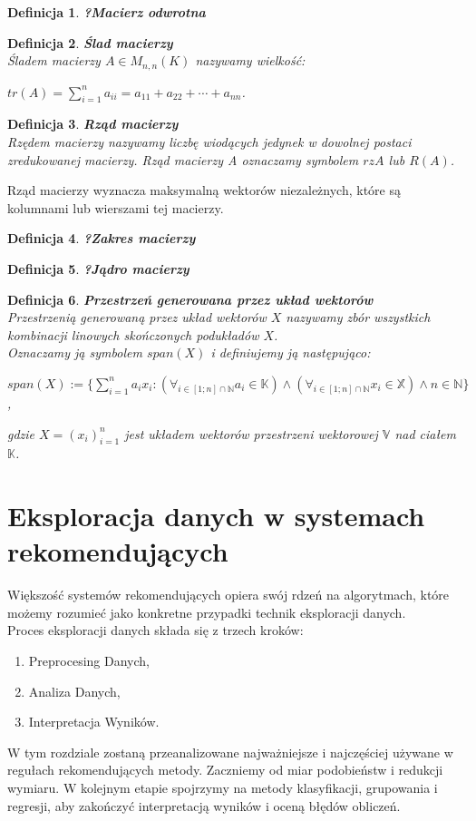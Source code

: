 \documentclass[12pt,a4paper]{report}
\newtheorem{df}{Definicja}
\begin{document}
\begin{df}\textbf{?Macierz odwrotna}
\end{df}

\begin{df}\textbf{Ślad macierzy}
\\Śladem macierzy  $A\in M_{n,n}(K)$ nazywamy wielkość:
\begin{center}
$tr(A) = \sum_{i=1}^n a_{ii} = a_{11} + a_{22} + \cdots + a_{nn}$.
\end{center}
\end{df}
\begin{df}\textbf{Rząd macierzy}%
\\Rzędem macierzy nazywamy liczbę wiodących jedynek w dowolnej postaci zredukowanej macierzy. Rząd macierzy A oznaczamy symbolem $rz A$ lub $R(A)$.
\end{df}
Rząd macierzy wyznacza maksymalną wektorów niezależnych, które są kolumnami lub wierszami tej macierzy.
\begin{df}\textbf{?Zakres macierzy}
\end{df}
\begin{df}\textbf{?Jądro macierzy}
\end{df}
\begin{df}\textbf{Przestrzeń generowana przez układ wektorów}
\\Przestrzenią generowaną przez układ wektorów $X$ nazywamy zbór wszystkich kombinacji linowych skończonych podukładów $X$.
\\Oznaczamy ją symbolem $span(X)$ i definiujemy ją następująco:
\begin{center}
$span(X) := \{\sum_{i=1}^n a_i x_i : (\forall_{i\in [1;n]\cap \mathbb{N}} a_i \in \mathbb{K}) \wedge (\forall_{i\in [1;n]\cap \mathbb{N}} x_i \in \mathbb{X}) \wedge n \in \mathbb{N}\}$,
\end{center}
gdzie $X = (x_i)_{i=1}^n$ jest układem wektorów przestrzeni wektorowej $\mathbb{V}$ nad ciałem $\mathbb{K}$.
\end{df}

\chapter{Eksploracja danych w systemach rekomendujących}
Większość systemów rekomendujących opiera swój rdzeń na algorytmach, które możemy rozumieć jako konkretne przypadki technik eksploracji danych. 
\\Proces eksploracji danych składa się z trzech kroków:
\begin{enumerate}
\item Preprocesing Danych,
\item Analiza Danych,
\item Interpretacja Wyników.
\end{enumerate}
W tym rozdziale zostaną przeanalizowane najważniejsze i najczęściej używane w regułach rekomendujących metody. Zaczniemy od miar podobieństw i redukcji wymiaru. W kolejnym etapie spojrzymy na metody klasyfikacji, grupowania i regresji, aby zakończyć interpretacją wyników i oceną błędów obliczeń.
\end{document}
